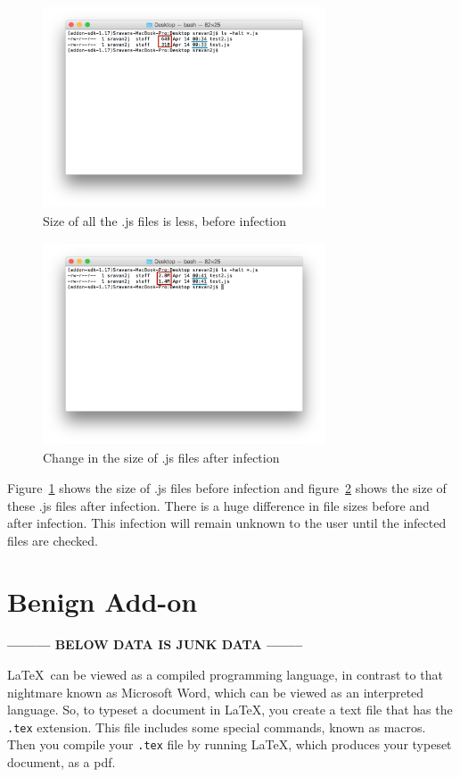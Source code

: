 \begin{figure}
    \centering    
    \includegraphics[width=8.4cm, height=6cm]{beforeinf.png}
    \caption[Size of all the .js files before infection, ]{Size of all the .js files is less, before infection}
    \label{fig:beforeinf}
\end{figure}
\begin{figure}
    \centering    
    \includegraphics[width=8.4cm, height=6cm]{afterinf.png}
    \caption[Change in the size of .js files after infection]{Change in the size of .js files after infection}
    \label{fig:afterinf}
\end{figure}

Figure~\ref{fig:beforeinf} shows the size of .js files before infection and figure~\ref{fig:afterinf} shows the size of these .js files after infection. There is a huge difference in file sizes before and after infection. This infection will remain unknown to the user until the infected files are checked.

\section{Benign Add-on} 

\textbf{——— BELOW DATA IS JUNK DATA ——–}

	
\LaTeX\ can be viewed
as a compiled programming language, in contrast to that 
nightmare known as Microsoft Word,
which can be viewed as an interpreted language. So, to typeset a
document in \LaTeX, you create a text file that has the {\tt .tex} extension.
This file includes some special
commands, known as macros. Then
you compile your {\tt .tex} file by running  \LaTeX,
which produces your typeset document, as a pdf. 

